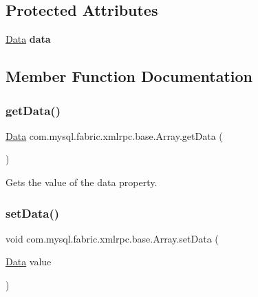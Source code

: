 \subsection*{Protected Attributes}
\begin{DoxyCompactItemize}
\item 
\mbox{\label{classcom_1_1mysql_1_1fabric_1_1xmlrpc_1_1base_1_1_array_a4e0884bc47fe02fec80edba77b5e50d8}} 
\mbox{\hyperlink{classcom_1_1mysql_1_1fabric_1_1xmlrpc_1_1base_1_1_data}{Data}} {\bfseries data}
\end{DoxyCompactItemize}


\subsection{Member Function Documentation}
\mbox{\label{classcom_1_1mysql_1_1fabric_1_1xmlrpc_1_1base_1_1_array_aad7e1390a6293640f9ca142a49fc0f68}} 
\subsubsection{\texorpdfstring{get\+Data()}{getData()}}
{\footnotesize\ttfamily \mbox{\hyperlink{classcom_1_1mysql_1_1fabric_1_1xmlrpc_1_1base_1_1_data}{Data}} com.\+mysql.\+fabric.\+xmlrpc.\+base.\+Array.\+get\+Data (\begin{DoxyParamCaption}{ }\end{DoxyParamCaption})}

Gets the value of the data property. \mbox{\label{classcom_1_1mysql_1_1fabric_1_1xmlrpc_1_1base_1_1_array_a7606bcd7ea96d0ef34153645d6272644}} 
\subsubsection{\texorpdfstring{set\+Data()}{setData()}}
{\footnotesize\ttfamily void com.\+mysql.\+fabric.\+xmlrpc.\+base.\+Array.\+set\+Data (\begin{DoxyParamCaption}\item[{\mbox{\hyperlink{classcom_1_1mysql_1_1fabric_1_1xmlrpc_1_1base_1_1_data}{Data}}}]{value }\end{DoxyParamCaption})}

